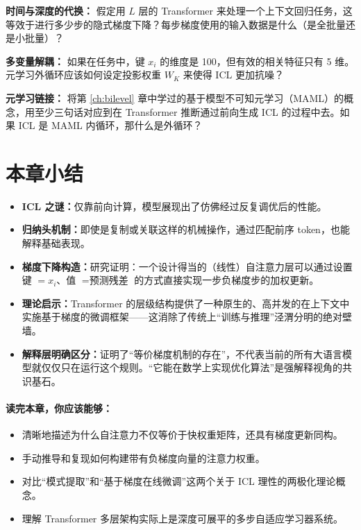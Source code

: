 \begin{exercise}
\textbf{时间与深度的代换：}
假定用 $L$ 层的 Transformer 来处理一个上下文回归任务，这等效于进行多少步的隐式梯度下降？每步梯度使用的输入数据是什么（是全批量还是小批量）？
\end{exercise}

\begin{exercise}
\textbf{多变量解耦：}
如果在任务中，键 $x_i$ 的维度是 100，但有效的相关特征只有 5 维。元学习外循环应该如何设定投影权重 $W_K$ 来使得 ICL 更加抗噪？
\end{exercise}

\begin{exercise}
\textbf{元学习链接：}
将第 \ref{ch:bilevel} 章中学过的基于模型不可知元学习（MAML）的概念，用至少三句话对应到在 Transformer 推断通过前向生成 ICL 的过程中去。如果 ICL 是 MAML 内循环，那什么是外循环？
\end{exercise}

\section{本章小结}
\label{sec:icl_summary}

\begin{itemize}
    \item \textbf{ICL 之谜：}仅靠前向计算，模型展现出了仿佛经过反复调优后的性能。
    \item \textbf{归纳头机制：}即使是复制或关联这样的机械操作，通过匹配前序 token，也能解释基础表现。
    \item \textbf{梯度下降构造：}研究证明：一个设计得当的（线性）自注意力层可以通过设置键 $=x_i$、值 $=\text{预测残差}$ 的方式直接实现一步负梯度步的加权更新。
    \item \textbf{理论启示：}Transformer 的层级结构提供了一种原生的、高并发的在上下文中实施基于梯度的微调框架——这消除了传统上“训练与推理”泾渭分明的绝对壁墙。
    \item \textbf{解释层明确区分：}证明了“等价梯度机制的存在”，不代表当前的所有大语言模型就仅仅只在运行这个规则。“它能在数学上实现优化算法”是强解释视角的共识基石。
\end{itemize}

\paragraph{读完本章，你应该能够：}
\begin{itemize}
    \item 清晰地描述为什么自注意力不仅等价于快权重矩阵，还具有梯度更新同构。
    \item 手动推导和复现如何构建带有负梯度向量的注意力权重。
    \item 对比“模式提取”和“基于梯度在线微调”这两个关于 ICL 理性的两极化理论概念。
    \item 理解 Transformer 多层架构实际上是深度可展平的多步自适应学习器系统。
\end{itemize}

